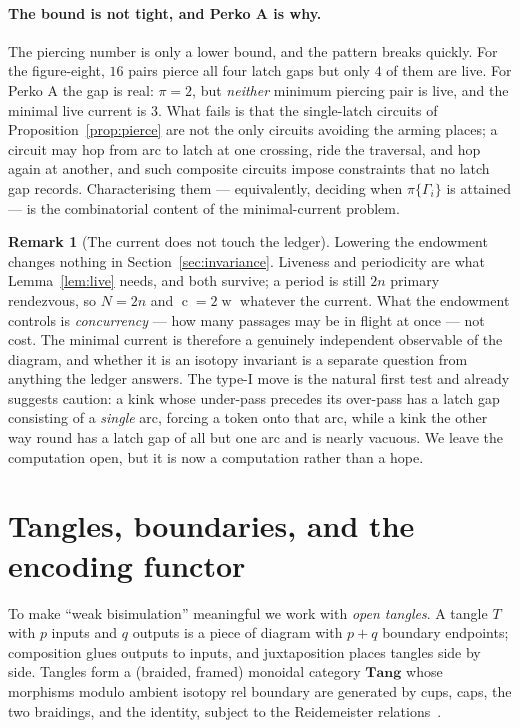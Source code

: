 \documentclass[11pt]{article}
\theoremstyle{definition}
\newtheorem{remark}{Remark}
\newcommand{\writhe}{\operatorname{w}}
\newcommand{\cost}{\operatorname{c}}
\begin{document}
\paragraph{The bound is not tight, and Perko A is why.}
The piercing number is only a lower bound, and the pattern breaks quickly. For the
figure-eight, $16$ pairs pierce all four latch gaps but only $4$ of them are live.
For Perko A the gap is real: $\pi=2$, but \emph{neither} minimum piercing pair is
live, and the minimal live current is $3$. What fails is that the single-latch
circuits of Proposition~\ref{prop:pierce} are not the only circuits avoiding the
arming places; a circuit may hop from arc to latch at one crossing, ride the
traversal, and hop again at another, and such composite circuits impose
constraints that no latch gap records. Characterising them --- equivalently,
deciding when $\pi\{\Gamma_i\}$ is attained --- is the combinatorial content of
the minimal-current problem.

\begin{remark}[The current does not touch the ledger]\label{rem:endow}
Lowering the endowment changes nothing in Section~\ref{sec:invariance}. Liveness
and periodicity are what Lemma~\ref{lem:live} needs, and both survive; a period is
still $2n$ primary rendezvous, so $N=2n$ and $\cost=2\writhe$ whatever the current.
What the endowment controls is \emph{concurrency} --- how many passages may be in
flight at once --- not cost. The minimal current is therefore a genuinely
independent observable of the diagram, and whether it is an isotopy invariant is a
separate question from anything the ledger answers. The type-I move is the natural
first test and already suggests caution: a kink whose under-pass precedes its
over-pass has a latch gap consisting of a \emph{single} arc, forcing a token onto
that arc, while a kink the other way round has a latch gap of all but one arc and
is nearly vacuous. We leave the computation open, but it is now a computation
rather than a hope.
\end{remark}

\section{Tangles, boundaries, and the encoding functor}\label{sec:functor}

To make ``weak bisimulation'' meaningful we work with \emph{open tangles}. A
tangle $T$ with $p$ inputs and $q$ outputs is a piece of diagram with $p+q$
boundary endpoints; composition glues outputs to inputs, and juxtaposition places
tangles side by side. Tangles form a (braided, framed) monoidal category
$\mathbf{Tang}$ whose morphisms modulo ambient isotopy rel boundary are generated
by cups, caps, the two braidings, and the identity, subject to the Reidemeister
relations~\cite{turaev}.
\end{document}
